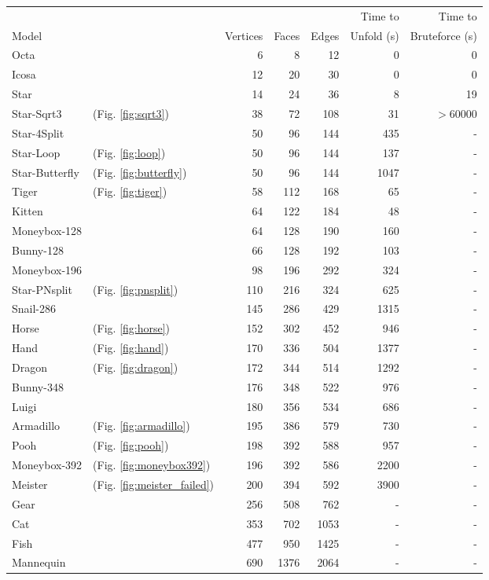\documentclass[draft,final]{vutinfth} %
\begin{document}
\begingroup
\centering
\begin{tabular}{|ll|rrr|r|r|}
\hline
& & & & &  Time to & Time to \\
Model & & Vertices & Faces & Edges & Unfold (s) & Bruteforce (s) \\
\hline
Octa & & 6 & 8 & 12 & 0 & 0 \\
Icosa & & 12& 20& 30 & 0 & 0 \\
Star & & 14& 24& 36 & 8 & 19 \\
Star-Sqrt3 & (Fig. \ref{fig:sqrt3}) & 38& 72& 108 & 31 & $>$60000 \\
Star-4Split & & 50& 96& 144 & 435 & -\\
Star-Loop & (Fig. \ref{fig:loop}) & 50& 96& 144 & 137 & -\\
Star-Butterfly & (Fig. \ref{fig:butterfly}) & 50& 96& 144 & 1047 & -\\
Tiger & (Fig. \ref{fig:tiger}) & 58& 112& 168 & 65 & -\\
Kitten & & 64& 122& 184 & 48 &- \\
Moneybox-128 & & 64& 128& 190 & 160 &- \\
Bunny-128 & & 66& 128& 192 & 103 &- \\
Moneybox-196 & & 98& 196& 292 & 324  &-\\
Star-PNsplit & (Fig. \ref{fig:pnsplit}) & 110& 216& 324 & 625 & -\\
Snail-286 & & 145& 286& 429 & 1315 & -\\
Horse & (Fig. \ref{fig:horse}) & 152& 302& 452 & 946  &-\\
Hand & (Fig. \ref{fig:hand}) & 170& 336& 504 & 1377  &-\\
Dragon & (Fig. \ref{fig:dragon}) & 172& 344& 514 & 1292  &-\\
Bunny-348 & & 176& 348& 522 & 976  &-\\
Luigi & & 180& 356& 534 & 686  &-\\
Armadillo & (Fig. \ref{fig:armadillo}) & 195& 386& 579 & 730  &-\\
Pooh & (Fig. \ref{fig:pooh}) & 198& 392& 588 & 957 &- \\
Moneybox-392 & (Fig. \ref{fig:moneybox392}) & 196& 392& 586 & 2200  &-\\
Meister & (Fig. \ref{fig:meister_failed}) & 200& 394& 592 & 3900 & - \\
Gear & & 256& 508& 762 & - &- \\
Cat & & 353& 702& 1053 & -  &-\\
Fish & & 477& 950& 1425 & -  &-\\
Mannequin & & 690& 1376& 2064 & -  &-\\
\hline
\end{tabular}
\end{document}
